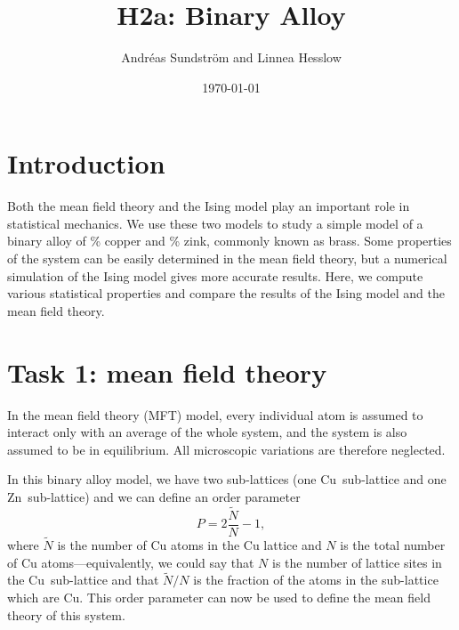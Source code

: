 
\usepackage{units}
\usepackage{physics}

\newcommand{\ee}{\mathrm{e}}
\newcommand{\ii}{\mathrm{i}}
\newcommand{\kB}{k_\mathrm{B}}
\newcommand{\MFT}{\text{MFT}}

\title{H2a: Binary Alloy}
\author{Andr\'eas Sundstr\"om and Linnea Hesslow}
\date{\today}





\section*{Introduction}
Both the mean field theory and the Ising model play an important role in statistical mechanics. We use these two models to study a simple model of a binary alloy of \unit[50]{\%} copper and \unit[50]{\%} zink, commonly known as brass. Some properties of the system can be easily determined in the mean field theory, but a numerical simulation of the Ising model gives more accurate results. Here, we compute various statistical properties and compare the results of the Ising model and the mean field theory.

\section*{Task 1: mean field theory}
In the mean field theory (MFT) model, every individual atom is assumed
to interact only with an average of the whole system, and the system
is also assumed to be in equilibrium. All microscopic
variations are therefore neglected.

In this binary alloy model, we have two sub-lattices (one
Cu~sub-lattice and one Zn~sub-lattice) and we can define an order
parameter
\begin{equation}
P=2\frac{\tilde{N}}{N}-1,
\end{equation}
where $\tilde{N}$ is the number of Cu atoms in the Cu lattice and $N$
is the total number of Cu atoms---equivalently, we could say that $N$
is the number of lattice sites in the Cu~sub-lattice and that
$\tilde{N}/N$ is the fraction of the atoms in the sub-lattice which
are Cu. This order parameter can now be used to define the mean field
theory of this system.

